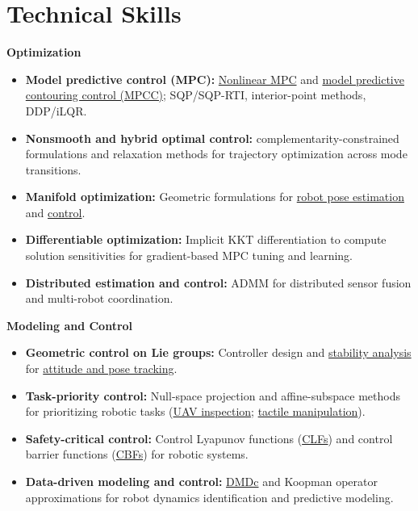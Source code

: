 \documentclass[letterpaper,11pt]{article}
\begin{document}
\section{Technical Skills}
{\small\textbf{Optimization}\par}
\begin{itemize}[leftmargin=0.22in, itemsep=2pt, parsep=0pt, topsep=4pt]
\small
\item \textbf{Model predictive control (MPC):} \href{https://arxiv.org/abs/2510.11525}{Nonlinear MPC} and \href{https://arxiv.org/abs/2609.36482}{model predictive contouring control (MPCC)}; SQP/SQP-RTI, interior-point methods, DDP/iLQR.
\item \textbf{Nonsmooth and hybrid optimal control:} complementarity-constrained formulations and relaxation methods for trajectory optimization across mode transitions.
\item \textbf{Manifold optimization:} Geometric formulations for \href{https://arxiv.org/abs/2410.13541}{robot pose estimation} and \href{https://arxiv.org/abs/2510.11525}{control}.
\item \textbf{Differentiable optimization:} Implicit KKT differentiation to compute solution sensitivities for gradient-based MPC tuning and learning.
\item \textbf{Distributed estimation and control:} ADMM for distributed sensor fusion and multi-robot coordination.
\end{itemize}
{\small\textbf{Modeling and Control}\par}
\begin{itemize}[leftmargin=0.22in, itemsep=2pt, parsep=0pt, topsep=4pt]
\small
\item \textbf{Geometric control on Lie groups:} Controller design and \href{https://arxiv.org/abs/2504.08841}{stability analysis} for \href{https://arxiv.org/abs/2510.11525}{attitude and pose tracking}.
\item \textbf{Task-priority control:} Null-space projection and affine-subspace methods for prioritizing robotic tasks (\href{https://arxiv.org/abs/2311.08019}{UAV inspection}; \href{https://arxiv.org/abs/2605.20392}{tactile manipulation}).
\item \textbf{Safety-critical control:} Control Lyapunov functions (\href{https://arxiv.org/abs/2504.08841}{CLFs}) and control barrier functions (\href{https://arxiv.org/abs/2504.08841}{CBFs}) for robotic systems.
\item \textbf{Data-driven modeling and control:} \href{https://doi.org/10.1016/j.ifacol.2023.12.088}{DMDc} and Koopman operator approximations for robot dynamics identification and predictive modeling.
\end{itemize}
\end{document}
